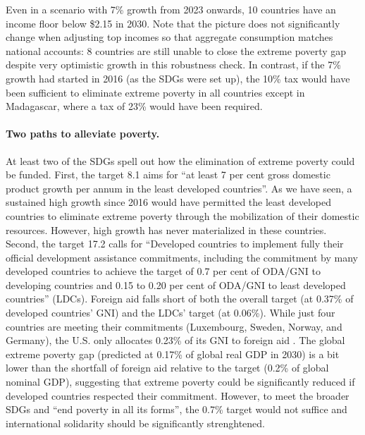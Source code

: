 Even in a scenario with 7\% growth from 2023 onwards, 10 countries have an income floor below \$2.15 in 2030. Note that the picture does not significantly change when adjusting top incomes so that aggregate consumption matches national accounts: %
8 countries are still unable to close the extreme poverty gap despite very optimistic growth in this robustness check. In contrast, if the 7\% growth had started in 2016 (as the SDGs were set up), the 10\% tax would have been sufficient to eliminate extreme poverty in all countries except in Madagascar, where a tax of 23\% would have been required.

\paragraph{Two paths to alleviate poverty.}
At least two of the SDGs spell out how the elimination of extreme poverty could be funded. %
First, the target 8.1 aims for ``at least 7 per cent gross domestic product growth per annum in the least developed countries''. As we have seen, a sustained high growth since 2016 would have permitted the least developed countries to eliminate extreme poverty through the mobilization of their domestic resources. However, high growth has never materialized in these countries. 
Second, the target 17.2 calls for ``Developed countries to implement fully their official development assistance commitments, including the commitment by many developed countries to achieve the target of 0.7 per cent of ODA/GNI to developing countries and 0.15 to 0.20 per cent of ODA/GNI to least developed countries'' (LDCs). Foreign aid falls short of both the overall target (at 0.37\% of developed countries' GNI) and the LDCs' target (at 0.06\%). While just four countries are meeting their commitments (Luxembourg, Sweden, Norway, and Germany), the U.S. only allocates 0.23\% of its GNI to foreign aid \citep{oecd_oda_2023}. The global extreme poverty gap (predicted at 0.17\% of global real GDP in 2030) is a bit lower than the shortfall of foreign aid relative to the target (0.2\% of global nominal GDP), suggesting that extreme poverty could be significantly reduced if developed countries respected their commitment. %
However, to meet the broader SDGs and ``end poverty in all its forms'', the 0.7\% target would not suffice and international solidarity should be significantly strenghtened. %

